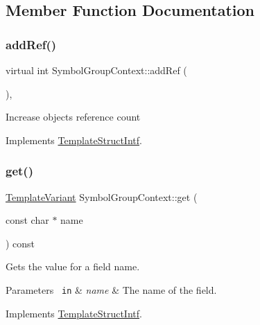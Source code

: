 \subsection{Member Function Documentation}
\mbox{\label{class_symbol_group_context_a8de19cf7aa3c966d418228af3cf487dc}} 
\subsubsection{\texorpdfstring{addRef()}{addRef()}}
{\footnotesize\ttfamily virtual int Symbol\+Group\+Context\+::add\+Ref (\begin{DoxyParamCaption}{ }\end{DoxyParamCaption})\hspace{0.3cm}{\ttfamily [inline]}, {\ttfamily [virtual]}}

Increase object\textquotesingle{}s reference count 

Implements \mbox{\hyperlink{class_template_struct_intf_a05fe97ad47633beb326f69686faed581}{Template\+Struct\+Intf}}.

\mbox{\label{class_symbol_group_context_a6d49b23c9e9aff55dcd9afe3e0b951b4}} 
\subsubsection{\texorpdfstring{get()}{get()}}
{\footnotesize\ttfamily \mbox{\hyperlink{class_template_variant}{Template\+Variant}} Symbol\+Group\+Context\+::get (\begin{DoxyParamCaption}\item[{const char $\ast$}]{name }\end{DoxyParamCaption}) const\hspace{0.3cm}{\ttfamily [virtual]}}

Gets the value for a field name. 
\begin{DoxyParams}[1]{Parameters}
\mbox{\texttt{ in}}  & {\em name} & The name of the field. \\
\hline
\end{DoxyParams}


Implements \mbox{\hyperlink{class_template_struct_intf_a3d610cb81b4adbb531ebed3aa3d09b51}{Template\+Struct\+Intf}}.

